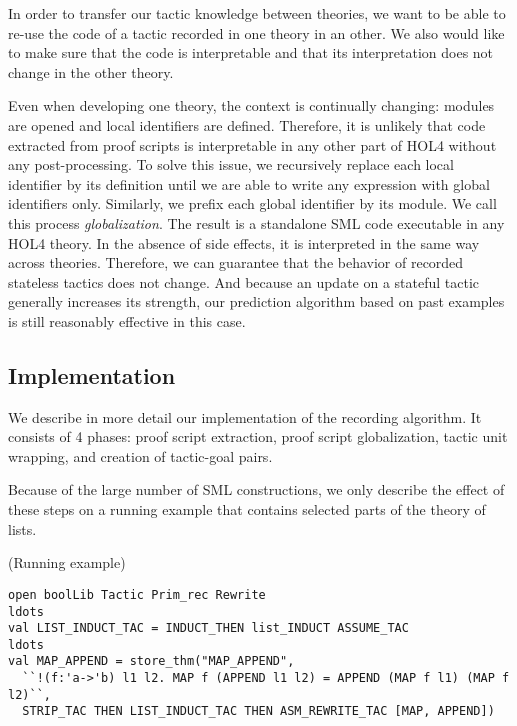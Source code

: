 \documentclass[runningheads,a4paper,draft]{svjour3}
\def\holfour{\textsf{HOL4}\xspace}
\def\sml{\textsf{SML}\xspace}
\begin{document}
In order to transfer our tactic knowledge between theories, we want to be able
to re-use the code of a tactic recorded in one theory in an
other. We also would like to make sure that the code is interpretable and that
its interpretation does not change in the other theory.

Even when developing one theory, the context is continually changing:
modules are opened and local identifiers are defined. Therefore, it is unlikely
that code extracted from proof scripts is interpretable in any other part of
\holfour without any post-processing.
To solve this issue, we recursively replace each local identifier by its
definition until we are able to write any expression with global identifiers
only. Similarly, we prefix each global identifier by its module.
We call this process \emph{globalization}. The result is a standalone \sml code
executable in any \holfour theory.  In the absence of side effects, it is
interpreted in the same way across theories.
Therefore, we can guarantee that the behavior of recorded stateless tactics
does not change. And because an update on a stateful tactic
generally increases its strength, our prediction algorithm based on past
examples is still reasonably effective in this case.

\subsection{Implementation}
We describe in more detail our implementation of the recording algorithm. It
consists of 4 phases: proof script extraction, proof script globalization,
tactic unit wrapping, and creation of tactic-goal pairs.

Because of the large number of \sml constructions, we only describe the effect
of these steps on a running example that contains selected parts of the theory
of lists.


\begin{example}\label{ex:running}(Running example)
\small
\begin{lstlisting}[language=SMLSmall]
open boolLib Tactic Prim_rec Rewrite
ldots
val LIST_INDUCT_TAC = INDUCT_THEN list_INDUCT ASSUME_TAC
ldots
val MAP_APPEND = store_thm("MAP_APPEND",
  ``!(f:'a->'b) l1 l2. MAP f (APPEND l1 l2) = APPEND (MAP f l1) (MAP f l2)``,
  STRIP_TAC THEN LIST_INDUCT_TAC THEN ASM_REWRITE_TAC [MAP, APPEND])
\end{lstlisting}
\end{example}
\end{document}
